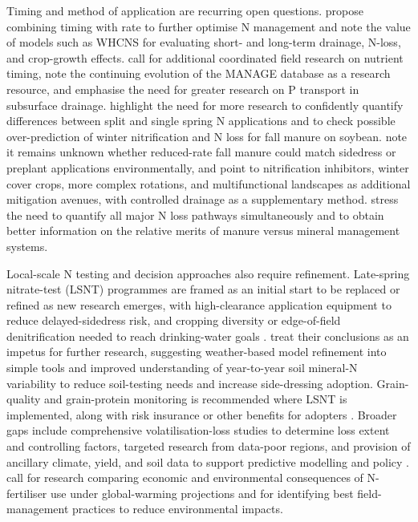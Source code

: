Timing and method of application are recurring open questions. \textcite{Liang2018} propose combining timing with rate to further optimise N management and note the value of models such as WHCNS for evaluating short- and long-term drainage, N-loss, and crop-growth effects. \textcite{Hertzberger2019} call for additional coordinated field research on nutrient timing, note the continuing evolution of the MANAGE database as a research resource, and emphasise the need for greater research on P transport in subsurface drainage. \textcite{Malone2007b} highlight the need for more research to confidently quantify differences between split and single spring N applications and to check possible over-prediction of winter nitrification and N loss for fall manure on soybean. \textcite{HernandezRamirez2011} note it remains unknown whether reduced-rate fall manure could match sidedress or preplant applications environmentally, and point to nitrification inhibitors, winter cover crops, more complex rotations, and multifunctional landscapes as additional mitigation avenues, with controlled drainage as a supplementary method. \textcite{Elmi2005} stress the need to quantify all major N loss pathways simultaneously and to obtain better information on the relative merits of manure versus mineral management systems.

Local-scale N testing and decision approaches also require refinement. Late-spring nitrate-test (LSNT) programmes are framed as an initial start to be replaced or refined as new research emerges, with high-clearance application equipment to reduce delayed-sidedress risk, and cropping diversity or edge-of-field denitrification needed to reach drinking-water goals \parencite{Jaynes2004}. \textcite{Malone2010} treat their conclusions as an impetus for further research, suggesting weather-based model refinement into simple tools and improved understanding of year-to-year soil mineral-N variability to reduce soil-testing needs and increase side-dressing adoption. Grain-quality and grain-protein monitoring is recommended where LSNT is implemented, along with risk insurance or other benefits for adopters \parencite{Karlen2005}. Broader gaps include comprehensive volatilisation-loss studies to determine loss extent and controlling factors, targeted research from data-poor regions, and provision of ancillary climate, yield, and soil data to support predictive modelling and policy \parencite{Chatterjee2020b}. \textcite{Haghnazari2020} call for research comparing economic and environmental consequences of N-fertiliser use under global-warming projections and for identifying best field-management practices to reduce environmental impacts.

